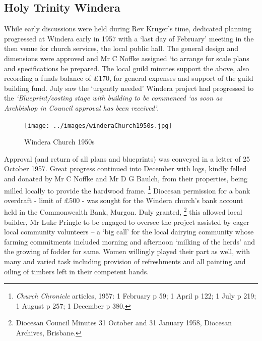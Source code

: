 \subsection{Holy Trinity Windera}



While early discussions were held during Rev Kruger's time, dedicated planning progressed at Windera early in 1957 with a `last day of February' meeting in the then venue for church services, the local public hall. The general design and dimensions were approved and Mr C Noffke assigned `to arrange for scale plans and specifications be prepared. The local guild minutes support the above, also recording a funds balance of \pounds170, for general expenses and support of the guild building fund. July saw the `urgently needed' Windera project had progressed to the \emph{`Blueprint/costing stage with building to be commenced `as soon as Archbishop in Council approval has been received'}.









\begin{figure}[!htb]
\begin{center}
\texttt{[image: ../images/winderaChurch1950s.jpg]}
\caption{Windera Church 1950s}
\end{center}
\end{figure}




Approval (and return of all plans and blueprints) was conveyed in a letter of 25 October 1957. Great progress continued into December with logs, kindly felled and donated by Mr C Noffke and Mr D G Baulch, from their properties, being milled locally to provide the hardwood frame. \footnote{\emph{Church Chronicle} articles, 1957: 1 February p 59; 1 April p 122; 1 July p 219; 1 August p 257; 1 December p 380.} Diocesan permission for a bank overdraft - limit of \pounds500 - was sought for the Windera church's bank account held in the Commonwealth Bank, Murgon. Duly granted, \footnote{Diocesan Council Minutes 31 October and 31 January 1958, Diocesan Archives, Brisbane.} this allowed local builder, Mr Luke Pringle to be engaged to oversee the project assisted by eager local community volunteers -- a `big call' for the local dairying community whose farming commitments included morning and afternoon `milking of the herds' and the growing of fodder for same. Women willingly played their part as well, with many and varied task including provision of refreshments and all painting and oiling of timbers left in their competent hands.


